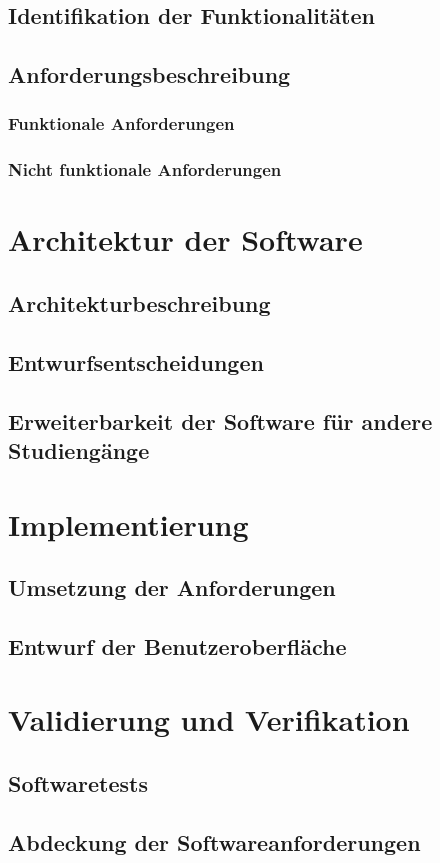 \documentclass{scrreprt}
\begin{document}
\section{Identifikation der Funktionalitäten}
\section{Anforderungsbeschreibung}
\subsection{Funktionale Anforderungen}
\subsection{Nicht funktionale Anforderungen}
\chapter{Architektur der Software}
\section{Architekturbeschreibung}
\section{Entwurfsentscheidungen}
\section{Erweiterbarkeit der Software für andere Studiengänge}
\chapter{Implementierung}
\section{Umsetzung der Anforderungen}
\section{Entwurf der Benutzeroberfläche}
\chapter{Validierung und Verifikation}
\section{Softwaretests}
\section{Abdeckung der Softwareanforderungen}
\end{document}
